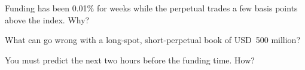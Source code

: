 \begin{interviewq}\label{iq:m3:perpetual-futures:4}
Funding has been 0.01\% for weeks while the perpetual trades a few basis points above the index. Why?
\end{interviewq}

\begin{interviewq}\label{iq:m3:perpetual-futures:5}
What can go wrong with a long-spot, short-perpetual book of USD~500 million?
\end{interviewq}

\begin{interviewq}\label{iq:m3:perpetual-futures:6}
You must predict the next  two hours before the funding time. How?
\end{interviewq}

